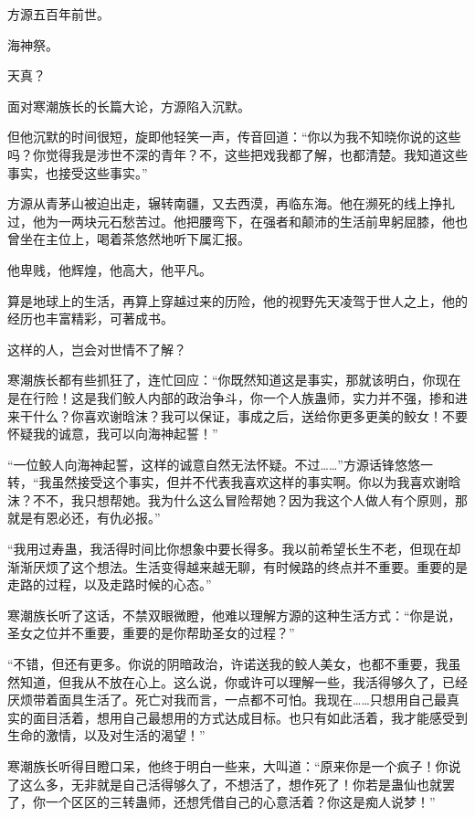 
\begin{this_body}

方源五百年前世。

海神祭。

天真？

面对寒潮族长的长篇大论，方源陷入沉默。

但他沉默的时间很短，旋即他轻笑一声，传音回道：“你以为我不知晓你说的这些吗？你觉得我是涉世不深的青年？不，这些把戏我都了解，也都清楚。我知道这些事实，也接受这些事实。”

方源从青茅山被迫出走，辗转南疆，又去西漠，再临东海。他在濒死的线上挣扎过，他为一两块元石愁苦过。他把腰弯下，在强者和颠沛的生活前卑躬屈膝，他也曾坐在主位上，喝着茶悠然地听下属汇报。

他卑贱，他辉煌，他高大，他平凡。

算是地球上的生活，再算上穿越过来的历险，他的视野先天凌驾于世人之上，他的经历也丰富精彩，可著成书。

这样的人，岂会对世情不了解？

寒潮族长都有些抓狂了，连忙回应：“你既然知道这是事实，那就该明白，你现在是在行险！这是我们鲛人内部的政治争斗，你一个人族蛊师，实力并不强，掺和进来干什么？你喜欢谢晗沫？我可以保证，事成之后，送给你更多更美的鲛女！不要怀疑我的诚意，我可以向海神起誓！”

“一位鲛人向海神起誓，这样的诚意自然无法怀疑。不过……”方源话锋悠悠一转，“我虽然接受这个事实，但并不代表我喜欢这样的事实啊。你以为我喜欢谢晗沫？不不，我只想帮她。我为什么这么冒险帮她？因为我这个人做人有个原则，那就是有恩必还，有仇必报。”

“我用过寿蛊，我活得时间比你想象中要长得多。我以前希望长生不老，但现在却渐渐厌烦了这个想法。生活变得越来越无聊，有时候路的终点并不重要。重要的是走路的过程，以及走路时候的心态。”

寒潮族长听了这话，不禁双眼微瞪，他难以理解方源的这种生活方式：“你是说，圣女之位并不重要，重要的是你帮助圣女的过程？”

“不错，但还有更多。你说的阴暗政治，许诺送我的鲛人美女，也都不重要，我虽然知道，但我从不放在心上。这么说，你或许可以理解一些，我活得够久了，已经厌烦带着面具生活了。死亡对我而言，一点都不可怕。我现在……只想用自己最真实的面目活着，想用自己最想用的方式达成目标。也只有如此活着，我才能感受到生命的激情，以及对生活的渴望！”

寒潮族长听得目瞪口呆，他终于明白一些来，大叫道：“原来你是一个疯子！你说了这么多，无非就是自己活得够久了，不想活了，想作死了！你若是蛊仙也就罢了，你一个区区的三转蛊师，还想凭借自己的心意活着？你这是痴人说梦！”


\end{this_body}
